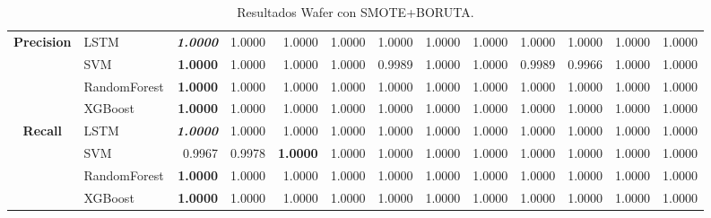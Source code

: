 \begin{table}[H]
\begin{adjustbox}{max width=13cm}
\begin{tabular}{|c|l|r|r|r|r|r|r|r|r|r|r|r|}
			\hline
			\textbf{Precision} &  LSTM & \textit{ \textbf{  1.0000 } } &  1.0000 &  1.0000 &  1.0000 &  1.0000 &  1.0000 &  1.0000 &  1.0000 &  1.0000 &  1.0000 &  1.0000 \\
			&  SVM & \textbf{  1.0000 } &  1.0000 &  1.0000 &  1.0000 &  0.9989 &  1.0000 &  1.0000 &  0.9989 &  0.9966 &  1.0000 &  1.0000 \\
			&  RandomForest & \textbf{  1.0000 } &  1.0000 &  1.0000 &  1.0000 &  1.0000 &  1.0000 &  1.0000 &  1.0000 &  1.0000 &  1.0000 &  1.0000 \\
			&  XGBoost & \textbf{  1.0000 } &  1.0000 &  1.0000 &  1.0000 &  1.0000 &  1.0000 &  1.0000 &  1.0000 &  1.0000 &  1.0000 &  1.0000 \\
			\hline
			\textbf{Recall} &  LSTM & \textit{ \textbf{  1.0000 } } &  1.0000 &  1.0000 &  1.0000 &  1.0000 &  1.0000 &  1.0000 &  1.0000 &  1.0000 &  1.0000 &  1.0000 \\
			&  SVM &  0.9967 &  0.9978 & \textbf{  1.0000 } &  1.0000 &  1.0000 &  1.0000 &  1.0000 &  1.0000 &  1.0000 &  1.0000 &  1.0000 \\
			&  RandomForest & \textbf{  1.0000 } &  1.0000 &  1.0000 &  1.0000 &  1.0000 &  1.0000 &  1.0000 &  1.0000 &  1.0000 &  1.0000 &  1.0000 \\
			&  XGBoost & \textbf{  1.0000 } &  1.0000 &  1.0000 &  1.0000 &  1.0000 &  1.0000 &  1.0000 &  1.0000 &  1.0000 &  1.0000 &  1.0000 \\
			\hline
		\end{tabular}
	\end{adjustbox}
	\caption{Resultados Wafer con SMOTE+BORUTA.}
	\label{tab:Wafer_SMOTE_BORUTA}
\end{table}

